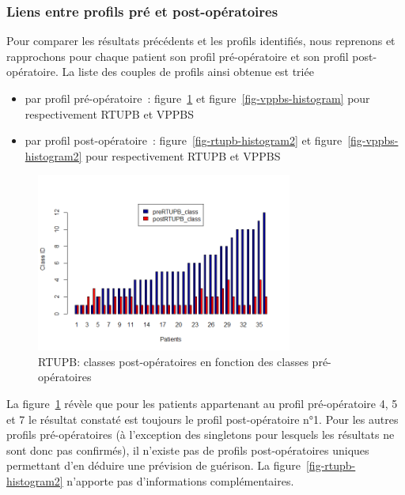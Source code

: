 %

\subsubsection{Liens entre profils pré et post-opératoires}

Pour comparer les résultats précédents et les profils identifiés, nous reprenons et rapprochons pour chaque patient son profil pré-opératoire et son profil post-opératoire. La liste des couples de profils ainsi obtenue
est triée
\begin{itemize}
 \item  par profil pré-opératoire~: figure~\ref{fig-rtupb-histogram} et figure~\ref{fig-vppbs-histogram} pour respectivement RTUPB et VPPBS
 \item  par profil post-opératoire~: figure~\ref{fig-rtupb-histogram2} et figure~\ref{fig-vppbs-histogram2} pour respectivement RTUPB et VPPBS
\end{itemize}

\begin{figure}[H]
\centering
\includegraphics[width=0.75\textwidth]{../Fig/RTUPB/rtupb-histogram-pre-post.png}
\caption{RTUPB: classes post-opératoires en fonction des classes pré-opératoires}
\label{fig-rtupb-histogram}
\end{figure}

La figure~\ref{fig-rtupb-histogram} révèle que pour les patients appartenant au profil pré-opératoire 4, 5 et 7 le résultat constaté est toujours le profil post-opératoire n°1.  Pour les autres profils pré-opératoires (à l'exception des singletons pour lesquels les résultats ne sont donc pas confirmés), il n'existe pas de profils post-opératoires uniques permettant d'en déduire une prévision de guérison.
La figure~\ref{fig-rtupb-histogram2} n'apporte pas d'informations complémentaires.

